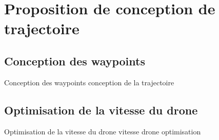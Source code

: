 \section{Proposition de conception de trajectoire}

\subsection{Conception des waypoints}
\begin{frame}{Conception des waypoints}
conception de la trajectoire
\end{frame}

\subsection{Optimisation de la vitesse du drone}

\begin{frame}{Optimisation de la vitesse du drone}
vitesse drone optimisation
\end{frame}
